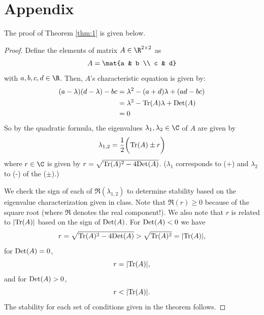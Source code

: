 \documentclass{homework}
\begin{document}
\section{Appendix}

The proof of Theorem \ref{thm:1} is given below.

\begin{proof}
    Define the elements of matrix $A\in\R^{2\times 2}$ as
    \begin{equation}
        A = \mat{a & b \\ c & d}
    \end{equation}
    with $a,b,c,d\in\R$. Then, $A$'s characteristic equation is
    given by:
    \begin{align*}
        (a - \lambda)(d-\lambda) - bc 
            &= \lambda^2 - (a + d)\lambda + (ad - bc) \\
            &= \lambda^2 - \text{Tr}(A) \lambda + \text{Det}(A) \\
            &= 0
    \end{align*}
    So by the quadratic formula, the eigenvalues $\lambda_1,\lambda_2\in\C$
    of $A$ are given by
    \begin{equation}
        \lambda_{1,2} = \frac{1}{2}\biggl(
            \text{Tr}(A) \pm r
        \biggr)
    \end{equation}
    where $r\in\C$ is given by $r = \sqrt{\text{Tr}(A)^2 - 4\text{Det}(A)}$.
    ($\lambda_1$ corresponds to (+) and $\lambda_2$ to (-) of the ($\pm$).)

    We check the sign of each of $\Re(\lambda_{1,2})$   
    to determine stability based on the eigenvalue characterization
    given in class.
    Note that $\Re(r) \geq 0$ because of the square root
    (where $\Re$ denotes the real component!).  We also note that 
    $r$ is related to $|\text{Tr}(A)|$ based on the sign of $\text{Det}(A)$. For $\text{Det}(A) < 0$
    we have
    \begin{equation*}
        r = \sqrt{\text{Tr}(A)^2 - 4\text{Det}(A)} > \sqrt{\text{Tr}(A)^2} = |\text{Tr}(A)|,
    \end{equation*}
    for $\text{Det}(A) = 0$,
    \begin{equation*}
        r = |\text{Tr}(A)|,
    \end{equation*}
    and for $\text{Det}(A) > 0$,
    \begin{equation*}
        r < |\text{Tr}(A)|.
    \end{equation*}
    The stability for each set of conditions
    given in the theorem follows.



\end{proof}
\end{document}
